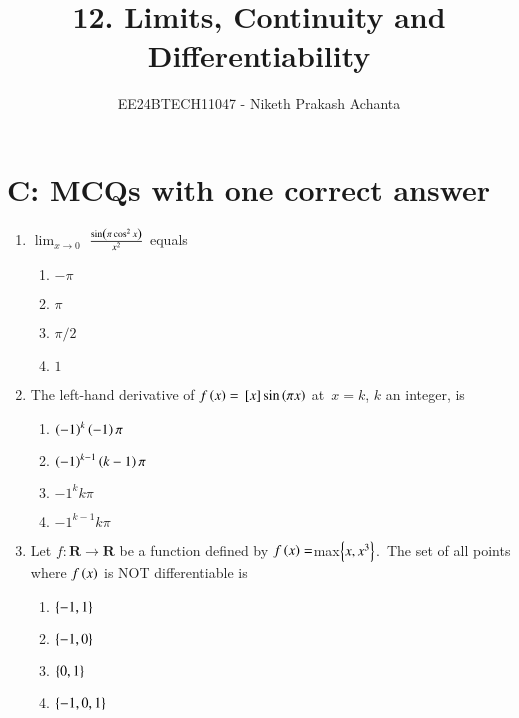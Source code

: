 \documentclass[journal,12pt,onecolumn]{IEEEtran}
\theoremstyle{remark}
\begin{document}

\vspace{3cm}

\title{12. Limits, Continuity and Differentiability}
\author{EE24BTECH11047 - Niketh Prakash Achanta}
\maketitle
\bigskip
\section{C: MCQs with one correct answer}

\renewcommand{\thefigure}{\theenumi}
\renewcommand{\thetable}{\theenumi}
\begin{enumerate}
\item %

	$\lim_{x\to0}$  $\frac{\sin\left(\pi \cos^2 x \right)}{x^2}$ \: equals \hfill{}
    \begin{enumerate}
     \item $-\pi$
     \item $\pi$
     \item $\pi/2$
     \item $1$\\
     \end{enumerate}

\item %
	The left-hand derivative of $f\left(x\right)={}\left[x\right]\sin\left(\pi x\right)$ at\ $x=k$, $k$ an integer, is \hfill{}
    \begin{enumerate}
	    \item $\left(-1\right)^k \left(-1\right) \pi$
	    \item $\left(-1\right)^{k-1}\left(k-1\right) \pi$
            \item $-1^k k\pi$
     	    \item $-1^{k-1} k\pi$\\
    \end{enumerate}

\item %

	Let $f:\mathbf{R}\rightarrow\mathbf{R}$ be a function defined by $f\left(x\right)=$max$\left\{x,x^3\right\}$.\ The set of all points where $f\left(x\right)$ is NOT differentiable is \hfill{}
    \begin{enumerate}
     \item $\left\{-1,1\right\}$
     \item $\left\{-1,0\right\}$
     \item $\left\{0,1\right\}$
     \item $\left\{-1,0,1\right\}$\\
    \end{enumerate}



\end{enumerate}
\end{document}
